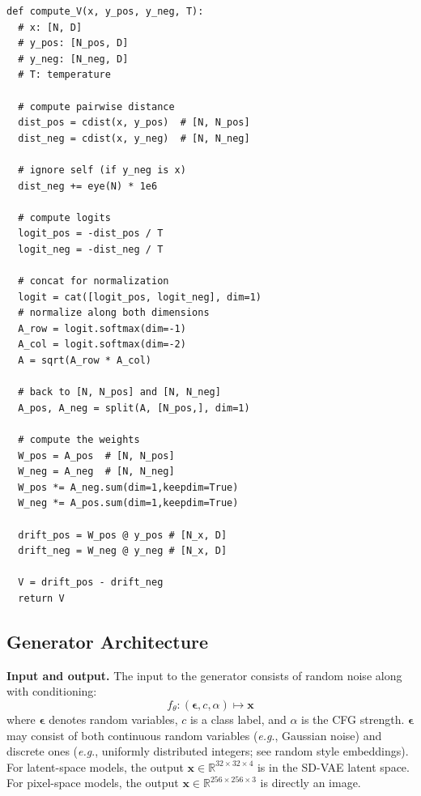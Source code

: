 \documentclass{article}
\newcommand{\vv}[1]{\mathbf{#1}}
\newcommand{\x}{\vv{x}}
\newcommand{\V}{\vv{V}}
\newcommand{\e}{{\boldsymbol{\epsilon}}}
\renewcommand{\paragraph}[1]{\vspace{.05em}\noindent\textbf{#1}}
\def\onedot{.}
\def\eg{\emph{e.g}\onedot} \def\Eg{\emph{E.g}\onedot}
\theoremstyle{plain}
\theoremstyle{definition}
\theoremstyle{remark}
\begin{document}
\begin{algorithm}[t]
\caption{Computing the drifting field $\V$.}
\label{alg:drift_code}
\begin{lstlisting}
def compute_V(x, y_pos, y_neg, T):
  # x: [N, D]
  # y_pos: [N_pos, D]
  # y_neg: [N_neg, D]
  # T: temperature

  # compute pairwise distance
  dist_pos = cdist(x, y_pos)  # [N, N_pos]
  dist_neg = cdist(x, y_neg)  # [N, N_neg]

  # ignore self (if y_neg is x)
  dist_neg += eye(N) * 1e6

  # compute logits
  logit_pos = -dist_pos / T
  logit_neg = -dist_neg / T

  # concat for normalization
  logit = cat([logit_pos, logit_neg], dim=1)
  # normalize along both dimensions
  A_row = logit.softmax(dim=-1)
  A_col = logit.softmax(dim=-2)
  A = sqrt(A_row * A_col)

  # back to [N, N_pos] and [N, N_neg]
  A_pos, A_neg = split(A, [N_pos,], dim=1)

  # compute the weights
  W_pos = A_pos  # [N, N_pos]
  W_neg = A_neg  # [N, N_neg]
  W_pos *= A_neg.sum(dim=1,keepdim=True)
  W_neg *= A_pos.sum(dim=1,keepdim=True)

  drift_pos = W_pos @ y_pos # [N_x, D]
  drift_neg = W_neg @ y_neg # [N_x, D]

  V = drift_pos - drift_neg
  return V
\end{lstlisting}
\end{algorithm}


\subsection{Generator Architecture}
\label{sec:appendix_generator}

\paragraph{Input and output.}
The input to the generator consists of random noise along with conditioning:
\[
f_\theta: (\e, c, \alpha) \mapsto \x
\]
where $\e$ denotes random variables, $c$ is a class label, and $\alpha$ is the CFG strength.
$\e$ may consist of both continuous random variables (\eg, Gaussian noise) and discrete ones (\eg, uniformly distributed integers; see random style embeddings).
For latent-space models, the output $\mathbf{x} \in \mathbb{R}^{32\times 32\times 4}$ is in the SD-VAE latent space.
For pixel-space models, the output $\mathbf{x} \in \mathbb{R}^{256\times 256\times 3}$ is directly an image.
\end{document}

